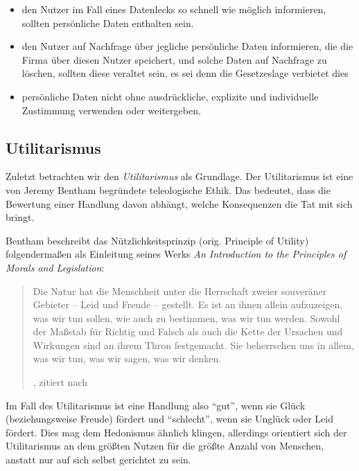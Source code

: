 \begin{itemize}
    \item den Nutzer im Fall eines Datenlecks so schnell wie möglich informieren, sollten persönliche Daten enthalten sein.
    \item den Nutzer auf Nachfrage über jegliche persönliche Daten informieren, die die Firma über diesen Nutzer speichert, und solche Daten auf Nachfrage zu löschen, sollten diese veraltet sein, es sei denn die Gesetzeslage verbietet dies
    \item persönliche Daten nicht ohne ausdrückliche, explizite und individuelle Zustimmung verwenden oder weitergeben.
\end{itemize}

\subsection{Utilitarismus}

Zuletzt betrachten wir den \emph{Utilitarismus} als Grundlage.
Der Utilitarismus ist eine von Jeremy Bentham begründete teleologische Ethik. Das bedeutet, dass die Bewertung einer Handlung davon abhängt,
welche Konsequenzen die Tat mit sich bringt. \cite{noauthor_teleological_nodate}

Bentham beschreibt das Nützlichkeitsprinzip (orig. Principle of Utility) folgendermaßen als Einleitung seines Werks \emph{An Introduction to the Principles of Morals and Legislation}:
\blockquote[\cite{bentham_principle_1780}, zitiert nach \cite{bensch_philosophisches_1984}]{
Die Natur hat die Menschheit unter die Herrschaft zweier souveräner Gebieter – Leid und Freude – gestellt. Es ist an ihnen allein aufzuzeigen, was wir tun sollen, wie auch zu bestimmen, was wir tun werden. 
Sowohl der Maßstab für Richtig und Falsch als auch die Kette der Ursachen und Wirkungen sind an ihrem Thron festgemacht. Sie beherrschen uns in allem, was wir tun, was wir sagen, was wir denken.
}

Im Fall des Utilitarismus ist eine Handlung also \enquote{gut}, wenn sie Glück (beziehungsweise Freude) fördert und \enquote{schlecht}, wenn sie Unglück oder Leid fördert.
Dies mag dem Hedonismus ähnlich klingen, allerdings orientiert sich der Utilitarismus an dem größten Nutzen für die größte Anzahl von Menschen, anstatt nur auf sich selbst gerichtet zu sein. \cite{white_principle_2001}



